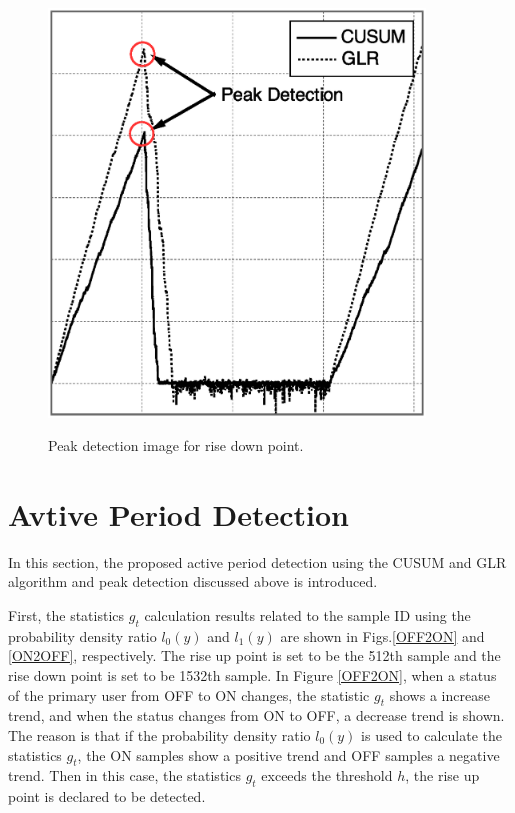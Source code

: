\begin{center}
  \begin{figure}[!htp]
    \centering
    \includegraphics[width=100mm]{peak_ON2OFF.eps}
    \label{peak_ON2OFF}
    \caption{Peak detection image for rise down point.}
  \end{figure}
\end{center} 

\section{Avtive Period Detection}
In this section, the proposed active period detection using the CUSUM and GLR algorithm and peak detection discussed above is introduced. 

First, the statistics $g_t$ calculation results related to the sample ID using the probability density ratio $l_0(y)$ and $l_1(y)$ are shown in Figs.\ref{OFF2ON} and \ref{ON2OFF}, respectively. The rise up point is set to be the 512th sample and the rise down point is set to be 1532th sample.
In Figure \ref{OFF2ON}, when a status of the primary user from OFF to ON changes, the statistic $g_t$ shows a increase trend, and when the status changes from ON to OFF, a decrease trend is shown. The reason is that if the probability density ratio $l_0(y)$ is used to calculate the statistics $g_t$, the ON samples show a positive trend and OFF samples a negative trend. Then in this case, the statistics $g_t$ exceeds the threshold $h$, the rise up point is declared to be detected.

